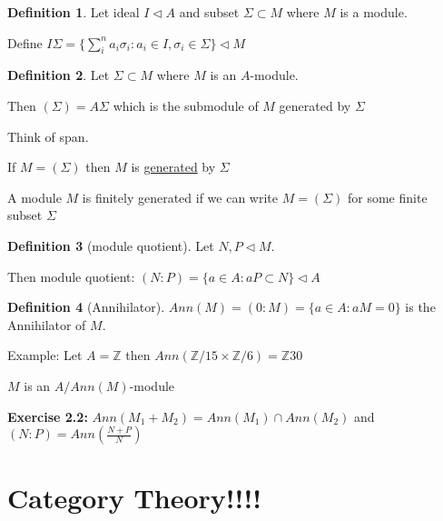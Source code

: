 \documentclass{article}
\theoremstyle{definition}
\newtheorem{definition}{Definition}
\begin{document}
\begin{definition}
    Let ideal \(I \triangleleft A\) and subset \(\Sigma \subset M\) where \(M\) is a module.

    Define \(I \Sigma = \{ \sum_{i}^n a_i \sigma_i : a_i\in I, \sigma_i \in \Sigma \} \triangleleft M \) 
\end{definition}

\begin{definition}
    Let \(\Sigma \subset M\) where \(M\) is an \(A\)-module.

    Then \((\Sigma)= A \Sigma\) which is the submodule of \(M\) generated by \(\Sigma\) 

    Think of span.

    If \(M = (\Sigma)\) then \(M\) is \underline{generated} by \(\Sigma\) 

    A module \(M\) is finitely generated if we can write \(M = (\Sigma)\) for some finite subset \(\Sigma\) 
\end{definition}

\begin{definition}
    [module quotient]

    Let \(N,P \triangleleft M\).

    Then module quotient: \((N : P) = \{ a\in A : aP \subset N \} \triangleleft A\) 

\end{definition}

\begin{definition}
    [Annihilator]

    \(Ann(M)=(0:M)=\{ a\in A : aM = 0 \} \) is the Annihilator of \(M\).
\end{definition}

Example: Let \(A = \mathbb{Z}\) then \(Ann(\mathbb{Z} / 15 \times \mathbb{Z} /6) = \mathbb{Z} 30\) 

\(M\) is an \(A / Ann(M)\)-module

\textbf{Exercise 2.2:} \(Ann(M_1 + M_2)= Ann(M_1) \cap Ann(M_2)\) and \((N : P) = Ann\left( \frac{N+P}{N} \right) \)  

\section*{Category Theory!!!!}
\end{document}
